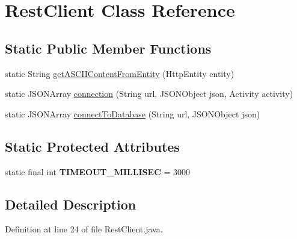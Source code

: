 \hypertarget{classapp_1_1utilities_1_1_rest_client}{\section{Rest\-Client Class Reference}
\label{classapp_1_1utilities_1_1_rest_client}
}
\subsection*{Static Public Member Functions}
\begin{DoxyCompactItemize}
\item 
static String \hyperlink{classapp_1_1utilities_1_1_rest_client_a2d392fc914b10e3984e550344526dc0a}{get\-A\-S\-C\-I\-I\-Content\-From\-Entity} (Http\-Entity entity)
\item 
static J\-S\-O\-N\-Array \hyperlink{classapp_1_1utilities_1_1_rest_client_a88ca8592848d489a217b068f57313c1a}{connection} (String url, J\-S\-O\-N\-Object json, Activity activity)
\item 
static J\-S\-O\-N\-Array \hyperlink{classapp_1_1utilities_1_1_rest_client_a5f224773442c45c5cd119d6f6551b0e1}{connect\-To\-Database} (String url, J\-S\-O\-N\-Object json)
\end{DoxyCompactItemize}
\subsection*{Static Protected Attributes}
\begin{DoxyCompactItemize}
\item 
\hypertarget{classapp_1_1utilities_1_1_rest_client_af5858805af6e7dae14f55e3f4d0e0f9e}{static final int {\bfseries T\-I\-M\-E\-O\-U\-T\-\_\-\-M\-I\-L\-L\-I\-S\-E\-C} = 3000}\label{classapp_1_1utilities_1_1_rest_client_af5858805af6e7dae14f55e3f4d0e0f9e}

\end{DoxyCompactItemize}


\subsection{Detailed Description}


Definition at line 24 of file Rest\-Client.\-java.



